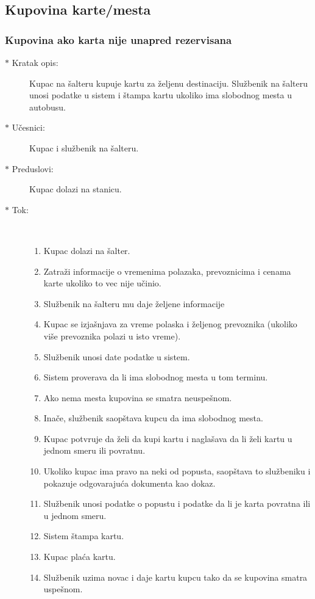 \newpage
\subsection{Kupovina karte/mesta}
\subsubsection{Kupovina ako karta nije unapred rezervisana}
\begin{description}
	\item[$\ast$ Kratak opis: ] Kupac na \v salteru kupuje kartu za \v zeljenu destinaciju. Slu\v zbenik na \v salteru unosi podatke u sistem i \v stampa kartu ukoliko ima slobodnog mesta u autobusu.
	\item[$\ast$ U\v cesnici: ] Kupac i slu\v zbenik na \v salteru.
	\item[$\ast$ Preduslovi: ] Kupac dolazi na stanicu.
	\item[$\ast$ Tok: ] \ \\
	\begin{enumerate}
		\item Kupac dolazi na \v salter.
		\item Zatra\v zi informacije o vremenima polazaka, prevoznicima i cenama karte ukoliko to vec nije u\v cinio.
		\item Slu\v zbenik na \v salteru mu daje \v zeljene informacije
		\item Kupac se izja\v snjava za vreme polaska i \v zeljenog prevoznika (ukoliko vi\v se prevoznika polazi u isto vreme).
		\item Slu\v zbenik unosi date podatke u sistem.
		\item Sistem proverava da li ima slobodnog mesta u tom terminu.
		\item Ako nema mesta kupovina se smatra neuspe\v snom.
		\item Ina\v ce, slu\v zbenik saop\v stava kupcu da ima slobodnog mesta.
		\item Kupac potvr\dj{}uje da \v zeli da kupi kartu i nagla\v sava da li \v zeli kartu u jednom smeru ili povratnu.
		\item Ukoliko kupac ima pravo na neki od popusta, saop\v stava to slu\v zbeniku i pokazuje odgovaraju\'ca dokumenta kao dokaz.
		\item Slu\v zbenik unosi podatke o popustu i podatke da li je karta povratna ili u jednom smeru.
		\item Sistem \v stampa kartu.
		\item Kupac pla\' ca kartu.
		\item Slu\v zbenik uzima novac i daje kartu kupcu tako da se kupovina smatra uspe\v snom.
	\end{enumerate}
\end{description}

